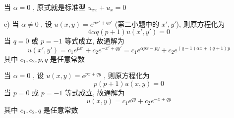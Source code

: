 \documentclass[a4paper, UTF8]{ctexart}				%
\begin{document}
        当 $\alpha = 0$ , 原式就是标准型 $u_{xx} + u_x = 0$

        c) 当 $\alpha \neq 0$ , 设 $u(x,y) = e^{px'+qy'}$ (第二小题中的 $x',y'$), 则原方程化为 
        \[
            4 \alpha q (p+1) u(x',y') = 0
        \]
        当 $q = 0$ 或 $p = -1$ 等式成立, 故通解为 
        \[
            u(x',y') = c_1 e^{px'} + c_2 e^{-x'+qy'} 
            = c_1 e^{\alpha p x - py} + c_2 e^{(q - 1)\alpha x + (q+1)y}
        \]
        其中 $c_1, c_2, p, q$ 是任意常数

        当 $\alpha = 0$ , 设 $u(x,y) = e^{px+qy}$ , 则原方程化为 
        \[
            p(p+1)u(x,y) = 0
        \]
        当 $p = 0$ 或 $p = -1$ 等式成立, 故通解为 
        \[
            u(x,y) = c_1 e^{qy} + c_2 e^{-x+qy}
        \]
        其中 $c_1, c_2, q$ 是任意常数
\end{document}
